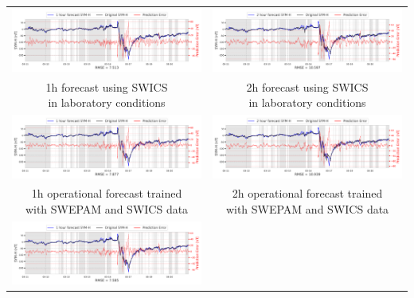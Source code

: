 \documentclass[draft,sw]{agutexSI2019}
\begin{document}
\begin{table}
\centering
\begin{tabular}{cc}
\includegraphics[width=0.49\linewidth]{paper_plots_shade/1h_swics/1h_swics_storm_41.png}
&
\includegraphics[width=0.49\linewidth]{paper_plots_shade/2h_swics/2h_swics_storm_41.png}
\\
\shortstack{1h forecast using SWICS\\ in laboratory conditions} & \shortstack{2h forecast using SWICS\\ in laboratory conditions}
\vspace*{12pt}
\\
\includegraphics[width=0.49\linewidth]{paper_plots_shade/1h_swics_rt/1h_swics_rt_storm_41.png}
&
\includegraphics[width=0.49\linewidth]{paper_plots_shade/2h_swics_rt/2h_swics_rt_storm_41.png}
\\
\shortstack{1h operational forecast trained\\ with SWEPAM and SWICS data} & \shortstack{2h operational forecast trained\\ with SWEPAM and SWICS data}
\vspace*{12pt}
\\
\includegraphics[width=0.49\linewidth]{paper_plots_shade/1h_swepam_rt/1h_swepam_rt_storm_41.png}

\end{tabular}
\end{table}
\end{document}
